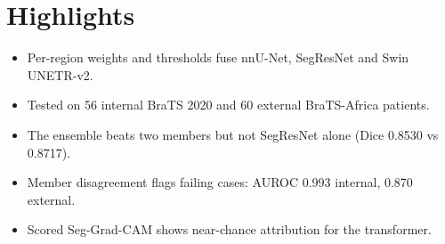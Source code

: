 \documentclass[12pt]{article}
\begin{document}
\section*{Highlights}

\begin{itemize}
\item Per-region weights and thresholds fuse nnU-Net, SegResNet and Swin UNETR-v2.
\item Tested on 56 internal BraTS 2020 and 60 external BraTS-Africa patients.
\item The ensemble beats two members but not SegResNet alone (Dice 0.8530 vs 0.8717).
\item Member disagreement flags failing cases: AUROC 0.993 internal, 0.870 external.
\item Scored Seg-Grad-CAM shows near-chance attribution for the transformer.
\end{itemize}
\end{document}
